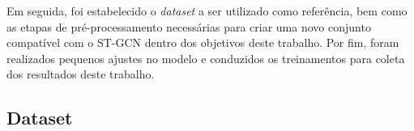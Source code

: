 Em seguida, foi estabelecido o \textit{dataset} a ser utilizado como referência, bem como as etapas de pré-processamento necessárias para criar uma novo conjunto compatível com o ST-GCN dentro dos objetivos deste trabalho. Por fim, foram realizados pequenos ajustes no modelo e conduzidos os treinamentos para coleta dos resultados deste trabalho.



\subsection{Dataset} %
\label{sec:dataset}

